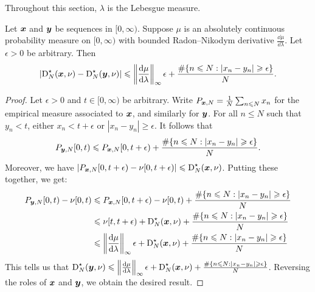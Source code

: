 Throughout this section, $\lambda$ is the Lebesgue measure. 

\begin{lemma}\label{lem:disc-of-two-seq}
Let ${\boldsymbol x}$ and ${\boldsymbol y}$ be sequences in $[0,\infty)$. Suppose $\mu$ is an 
absolutely continuous probability measure on $[0,\infty)$ with bounded 
Radon--Nikodym derivative $\frac{\dd \mu}{\dd\lambda}$. Let $\epsilon>0$ be 
arbitrary. Then 
\[
	\left|\operatorname{D}_N^\star({\boldsymbol x}, \nu) - \operatorname{D}_N^\star({\boldsymbol y},\nu)\right| \leqslant \left\|\frac{\mathrm{d}\mu}{\mathrm{d}\lambda}\right\|_\infty \epsilon + \frac{\#\{ n\leqslant N : |x_n - y_n| \geqslant \epsilon\}}{N} .
\]
\end{lemma}
\begin{proof}
Let $\epsilon>0$ and $t\in [0,\infty)$ be arbitrary. Write 
$P_{{\boldsymbol x},N} = \frac 1 N \sum_{n\leqslant N} x_n$ for the empirical measure 
associated to ${\boldsymbol x}$, and similarly for ${\boldsymbol y}$. For all $n\leqslant N$ 
such that $y_n<t$, either $x_n < t+\epsilon$ or 
$|x_n - y_n| \geqslant \epsilon$. It follows that 
\[
	P_{{\boldsymbol y},N}[0,t) \leqslant P_{{\boldsymbol x},N}[0,t+\epsilon) + \frac{\#\{ n\leqslant N : |x_n - y_n| \geqslant \epsilon\}}{N} .
\]
Moreover, we have 
$\left| P_{{\boldsymbol x},N}[0,t+\epsilon) - \nu[0,t+\epsilon)\right| \leqslant \operatorname{D}_N^\star({\boldsymbol x},\nu)$. Putting these together, we get: 
\begin{align*}
	P_{{\boldsymbol y},N}[0,t) - \nu[0,t) 
		&\leqslant P_{{\boldsymbol x},N}[0,t+\epsilon) - \nu[0,t) + \frac{\#\{ n\leqslant N : |x_n - y_n| \geqslant \epsilon\}}{N} \\
		&\leqslant \nu[t,t+\epsilon) + \operatorname{D}_N^\star({\boldsymbol x},\nu) + \frac{\#\{ n\leqslant N : |x_n - y_n| \geqslant \epsilon\}}{N} \\
		&\leqslant \left\|\frac{\mathrm{d}\mu}{\mathrm{d}\lambda}\right\|_\infty \epsilon + \operatorname{D}_N^\star({\boldsymbol x},\nu) + \frac{\#\{ n\leqslant N : |x_n - y_n| \geqslant \epsilon\}}{N} 
\end{align*}
This tells us that 
$\operatorname{D}_N^\star({\boldsymbol y},\nu) \leqslant \left\|\frac{\mathrm{d}\mu}{\mathrm{d}\lambda}\right\|_\infty \epsilon + \operatorname{D}_N^\star({\boldsymbol x},\nu) + \frac{\#\{ n\leqslant N : |x_n - y_n| \geqslant \epsilon\}}{N}$. 
Reversing the roles of ${\boldsymbol x}$ and ${\boldsymbol y}$, we obtain the desired result. 
\end{proof}

